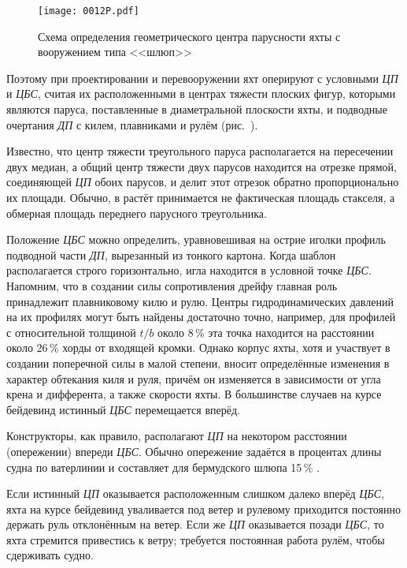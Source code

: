 \begin{figure}[!htb]
  \centering
  \texttt{[image: 0012P.pdf]}
  \caption{Схема определения геометрического центра парусности яхты с вооружением типа <<шлюп>>}
  \label{fig:12}
\end{figure}

Поэтому при проектировании и перевооружении яхт оперируют с условными
\textit{ЦП} и \textit{ЦБС}, считая их расположенными в центрах тяжести
плоских фигур, которыми являются паруса, поставленные в диаметральной
плоскости яхты, и подводные очертания \textit{ДП} с килем, плавниками
и рулём (рис.~).

Известно, что центр тяжести треугольного паруса располагается на
пересечении двух медиан, а общий центр тяжести двух парусов находится
на отрезке прямой, соединяющей \textit{ЦП} обоих парусов, и делит этот
отрезок обратно пропорционально их площади. Обычно, в растёт
принимается не фактическая площадь стакселя, а обмерная площадь
переднего парусного треугольника.

Положение \textit{ЦБС} можно определить, уравновешивая на острие
иголки профиль подводной части \textit{ДП}, вырезанный из тонкого
картона. Когда шаблон располагается строго горизонтально, игла
находится в условной точке \textit{ЦБС}. Напомним, что в создании силы
сопротивления дрейфу главная роль принадлежит плавниковому килю и
рулю. Центры гидродинамических давлений на их профилях могут быть
найдены достаточно точно, например, для профилей с относительной
толщиной $t/b$ около 8\,\% эта точка находится на расстоянии около
26\,\% хорды от входящей кромки. Однако корпус яхты, хотя и участвует
в создании поперечной силы в малой степени, вносит определённые
изменения в характер обтекания киля и руля, причём он изменяется в
зависимости от угла крена и дифферента, а также скорости яхты. В
большинстве случаев на курсе бейдевинд истинный \textit{ЦБС}
перемещается вперёд.

Конструкторы, как правило, располагают \textit{ЦП} на некотором
расстоянии (опережении) впереди \textit{ЦБС}. Обычно опережение
задаётся в процентах длины судна по ватерлинии и составляет для
бермудского шлюпа 15\,\% \lkvl.

Если истинный \textit{ЦП} оказывается расположенным слишком далеко
вперёд \textit{ЦБС}, яхта на курсе бейдевинд уваливается под ветер и
рулевому приходится постоянно держать руль отклонённым на ветер. Если
же \textit{ЦП} оказывается позади \textit{ЦБС}, то яхта стремится
привестись к ветру; требуется постоянная работа рулём, чтобы
сдерживать судно.

